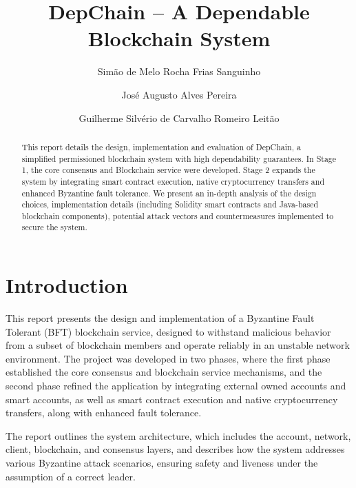 \documentclass[runningheads]{llncs}
\begin{document}
\title{DepChain -- A Dependable Blockchain System}
\author{Simão de Melo Rocha Frias Sanguinho \and José
Augusto Alves Pereira \and Guilherme Silvério de
Carvalho Romeiro Leitão}
\maketitle

\begin{abstract}
    This report details the design, implementation and evaluation of DepChain, a
    simplified permissioned blockchain system with high dependability
    guarantees. In Stage 1, the core consensus and Blockchain service were
    developed. Stage 2 expands the system by integrating smart contract
    execution, native cryptocurrency transfers and enhanced Byzantine fault
    tolerance. We present an in-depth analysis of the design choices,
    implementation details (including Solidity smart contracts and Java-based
    blockchain components), potential attack vectors and countermeasures
    implemented to secure the system.

\end{abstract}

\section{Introduction}
This report presents the design and implementation of a Byzantine Fault Tolerant
(BFT) blockchain service, designed to withstand malicious behavior from a subset
of blockchain members and operate reliably in an unstable network environment.
The project was developed in two phases, where the first phase established the
core consensus and blockchain service mechanisms, and the second phase refined
the application by integrating external owned accounts and smart accounts, as
well as smart contract execution and native cryptocurrency transfers, along with
enhanced fault tolerance. 

The report outlines the system architecture, which includes the account,
network, client, blockchain, and consensus layers, and describes how the system
addresses various Byzantine attack scenarios, ensuring safety and liveness under
the assumption of a correct leader.
\end{document}
